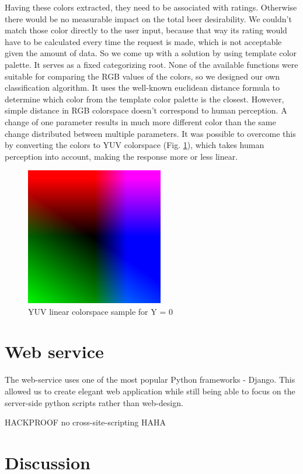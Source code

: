 \documentclass[10pt]{IEEEtran}
\begin{document}
Having these colors extracted, they need to be associated with ratings. Otherwise there would be no measurable impact on the total beer desirability. We couldn't match those color directly to the user input, because that way its rating would have to be calculated  every time the request is made, which is not acceptable given the amount of data. So we come up with a solution by using template color palette. It serves as a fixed categorizing root. None of the available functions were suitable for comparing the RGB values of the colors, so we designed our own classification algorithm. It uses the well-known euclidean distance formula to determine which color from the template color palette is the closest. However, simple distance in RGB colorspace doesn't correspond to human perception. A change of one parameter results in much more different color than the same change distributed between multiple parameters. It was possible to overcome this by converting the colors to YUV colorspace (Fig. \ref{fig:colorspace}), which takes human perception into account, making the response more or less linear. 


\begin{figure}[t]
  \centering
  \includegraphics[width=6cm]{./graphics/YUV.png}
  \caption{YUV linear colorspace sample for Y = 0}
  \label{fig:colorspace}
\end{figure}

\section{Web service}

The web-service uses one of the most popular Python frameworks - Django. This allowed us to create elegant web application while still being able to focus on the server-side python scripts rather than web-design. 

HACKPROOF no cross-site-scripting HAHA

\section{Discussion}
\end{document}
